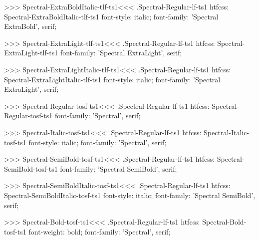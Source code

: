 >>>
\<Spectral-ExtraBoldItalic-tlf-ts1\><<<
.Spectral-Regular-lf-ts1
htfcss:  Spectral-ExtraBoldItalic-tlf-ts1  font-style: italic; font-family: 'Spectral ExtraBold', serif;

>>>
\<Spectral-ExtraLight-tlf-ts1\><<<
.Spectral-Regular-lf-ts1
htfcss:  Spectral-ExtraLight-tlf-ts1  font-family: 'Spectral ExtraLight', serif;

>>>
\<Spectral-ExtraLightItalic-tlf-ts1\><<<
.Spectral-Regular-lf-ts1
htfcss:  Spectral-ExtraLightItalic-tlf-ts1  font-style: italic; font-family: 'Spectral ExtraLight', serif;

>>>
\<Spectral-Regular-tosf-ts1\><<<
.Spectral-Regular-lf-ts1
htfcss:  Spectral-Regular-tosf-ts1  font-family: 'Spectral', serif;

>>>
\<Spectral-Italic-tosf-ts1\><<<
.Spectral-Regular-lf-ts1
htfcss:  Spectral-Italic-tosf-ts1  font-style: italic; font-family: 'Spectral', serif;

>>>
\<Spectral-SemiBold-tosf-ts1\><<<
.Spectral-Regular-lf-ts1
htfcss:  Spectral-SemiBold-tosf-ts1  font-family: 'Spectral SemiBold', serif;

>>>
\<Spectral-SemiBoldItalic-tosf-ts1\><<<
.Spectral-Regular-lf-ts1
htfcss:  Spectral-SemiBoldItalic-tosf-ts1  font-style: italic; font-family: 'Spectral SemiBold', serif;

>>>
\<Spectral-Bold-tosf-ts1\><<<
.Spectral-Regular-lf-ts1
htfcss:  Spectral-Bold-tosf-ts1  font-weight: bold; font-family: 'Spectral', serif;

